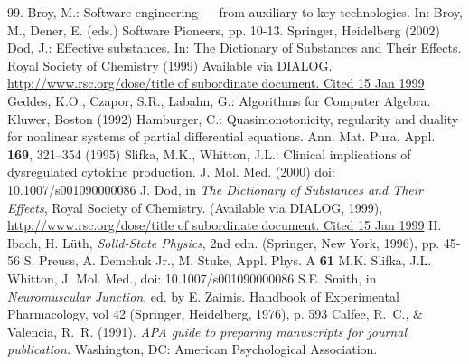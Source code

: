 \begin{thebibliography}{99.}%
%
%
 Broy, M.: Software engineering --- from auxiliary to key technologies. In: Broy, M., Dener, E. (eds.) Software Pioneers, pp. 10-13. Springer, Heidelberg (2002)
%
 Dod, J.: Effective substances. In: The Dictionary of Substances and Their Effects. Royal Society of Chemistry (1999) Available via DIALOG. \\
\url{http://www.rsc.org/dose/title of subordinate document. Cited 15 Jan 1999}
%
 Geddes, K.O., Czapor, S.R., Labahn, G.: Algorithms for Computer Algebra. Kluwer, Boston (1992) 
%
 Hamburger, C.: Quasimonotonicity, regularity and duality for nonlinear systems of partial differential equations. Ann. Mat. Pura. Appl. \textbf{169}, 321--354 (1995)
%
 Slifka, M.K., Whitton, J.L.: Clinical implications of dysregulated cytokine production. J. Mol. Med. (2000) doi: 10.1007/s001090000086 
%
%
 J. Dod, in \textit{The Dictionary of Substances and Their Effects}, Royal Society of Chemistry. (Available via DIALOG, 1999), 
\url{http://www.rsc.org/dose/title of subordinate document. Cited 15 Jan 1999}
%
 H. Ibach, H. L\"uth, \textit{Solid-State Physics}, 2nd edn. (Springer, New York, 1996), pp. 45-56 
%
 S. Preuss, A. Demchuk Jr., M. Stuke, Appl. Phys. A \textbf{61}
%
 M.K. Slifka, J.L. Whitton, J. Mol. Med., doi: 10.1007/s001090000086
%
 S.E. Smith, in \textit{Neuromuscular Junction}, ed. by E. Zaimis. Handbook of Experimental Pharmacology, vol 42 (Springer, Heidelberg, 1976), p. 593
%
%
%
%
 Calfee, R.~C., \& Valencia, R.~R. (1991). \textit{APA guide to preparing manuscripts for journal publication.} Washington, DC: American Psychological Association.

\end{thebibliography}
